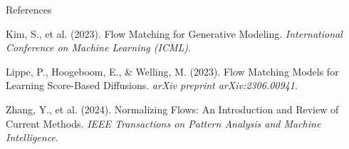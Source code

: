 \begin{frame}[allowframebreaks]{References}
\begin{thebibliography}{99}
    Kim, S., et al. (2023).
    Flow Matching for Generative Modeling.
    \textit{International Conference on Machine Learning (ICML)}.

    Lippe, P., Hoogeboom, E., \& Welling, M. (2023).
    Flow Matching Models for Learning Score-Based Diffusions.
    \textit{arXiv preprint arXiv:2306.00941}.

    Zhang, Y., et al. (2024).
    Normalizing Flows: An Introduction and Review of Current Methods.
    \textit{IEEE Transactions on Pattern Analysis and Machine Intelligence}.

    \end{thebibliography}
\end{frame}